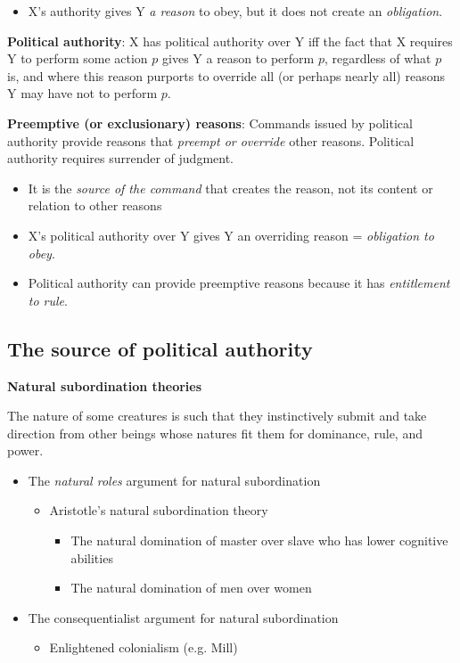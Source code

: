 \begin{itemize}
    \item X's authority gives Y \textit{a reason} to obey, but it does not
    create an \textit{obligation}.
\end{itemize}

\textbf{Political authority}:
X has political authority over Y iff the fact that X requires Y to perform some
action $p$ gives Y a reason to perform $p$, regardless of what $p$ is, and
where this reason purports to override all (or perhaps nearly all) reasons Y
may have not to perform $p$.

\textbf{Preemptive (or exclusionary) reasons}:
Commands issued by political authority provide reasons that \textit{preempt or
override} other reasons. Political authority requires surrender of judgment.

\begin{itemize}
    \item It is the \textit{source of the command} that creates the reason,
    not its content or relation to other reasons
    \item X's political authority over Y gives Y an overriding reason = 
    \textit{obligation to obey}.
    \item Political authority can provide preemptive reasons because it has
    \textit{entitlement to rule}.
\end{itemize}

\subsection{The source of political authority}

\textbf{Natural subordination theories}

The nature of some creatures is such that they instinctively submit and take
direction from other beings whose natures fit them for dominance, rule,
and power.

\begin{itemize}
    \item The \textit{natural roles} argument for natural subordination
    \begin{itemize}
        \item Aristotle's natural subordination theory
        \begin{itemize}
            \item The natural domination of master over slave who has lower
            cognitive abilities
            \item The natural domination of men over women
        \end{itemize}
    \end{itemize}
    \item The consequentialist argument for natural subordination
    \begin{itemize}
        \item Enlightened colonialism (e.g. Mill)
    \end{itemize}
\end{itemize}

